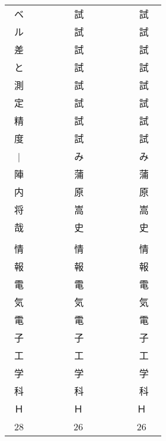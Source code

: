 \begin{center}
\begin{tabular}{|c|c|c|c|c|}
 ~ベ ~& ~~~~& ~試 ~& ~~~& ~試  ~\\
 ~ル ~& ~~~~& ~試 ~& ~~~& ~試  ~\\
 ~差 ~& ~~~~& ~試 ~& ~~~& ~試  ~\\
 ~と ~& ~~~~& ~試 ~& ~~~& ~試  ~\\
 ~測 ~& ~~~~& ~試 ~& ~~~& ~試  ~\\
 ~定 ~& ~~~~& ~試 ~& ~~~& ~試  ~\\
 ~精 ~& ~~~~& ~試 ~& ~~~& ~試  ~\\
 ~度 ~& ~~~~& ~試 ~& ~~~& ~試  ~\\
~$|$ ~& ~~~~& ~み ~& ~~~& ~み  ~\\
 ~陣 ~& ~~~~& ~蒲 ~&　~~~& ~蒲 ~\\
 ~内 ~& ~~~~& ~原 ~&　~~~& ~原 ~\\
 ~将 ~& ~~~~& ~嵩 ~&　~~~& ~嵩 ~\\
 ~哉 ~& ~~~~& ~史 ~&　~~~& ~史 ~\\\\
 ~情  ~& ~~~~& ~情 ~&　~~~&  ~情 ~\\
 ~報 ~& ~~~~& ~報 ~&　~~~&  ~報 ~\\
 ~電 ~& ~~~~& ~電 ~&　~~~&  ~電 ~\\
 ~気 ~& ~~~~& ~気 ~&　~~~&  ~気 ~\\
 ~電 ~& ~~~~& ~電 ~&　~~~&  ~電 ~\\
 ~子 ~& ~~~~& ~子 ~&　~~~&  ~子 ~\\
 ~工 ~& ~~~~& ~工 ~&　~~~&  ~工 ~\\
 ~学 ~& ~~~~& ~学 ~&　~~~&  ~学 ~\\
 ~科 ~& ~~~~& ~科 ~&　~~~&  ~科 ~\\
      
 ~Ｈ ~& ~~~~&Ｈ~&　~~~& Ｈ ~\\
 ~28 ~& ~~~~&26~&　~~~& 26 ~\\

\end{tabular}
\end{center}

